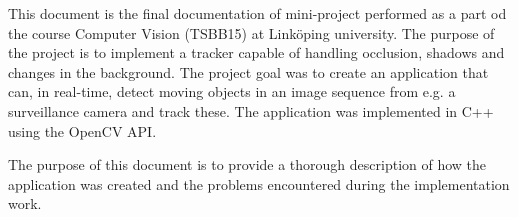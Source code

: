 This document is the final documentation of mini-project performed as a part od the course Computer Vision (TSBB15) at Linköping university. The purpose of the project is to implement a tracker capable of handling occlusion, shadows and changes in the background. The project goal was to create an application that can, in real-time, detect moving objects in an image sequence from e.g. a surveillance camera and track these. The application was implemented in C++ using the OpenCV API.

The purpose of this document is to provide a thorough description of how the application was created and the problems encountered during the implementation work.
